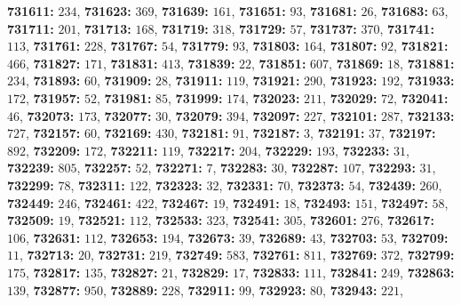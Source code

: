 \textsf{\bfseries 731611:} $234$, \textsf{\bfseries 731623:} $369$, \textsf{\bfseries 731639:} $161$, \textsf{\bfseries 731651:} $93$, \textsf{\bfseries 731681:} $26$, \textsf{\bfseries 731683:} $63$, \textsf{\bfseries 731711:} $201$, \textsf{\bfseries 731713:} $168$, \textsf{\bfseries 731719:} $318$, \textsf{\bfseries 731729:} $57$, \textsf{\bfseries 731737:} $370$, \textsf{\bfseries 731741:} $113$, \textsf{\bfseries 731761:} $228$, \textsf{\bfseries 731767:} $54$, \textsf{\bfseries 731779:} $93$, \textsf{\bfseries 731803:} $164$, \textsf{\bfseries 731807:} $92$, \textsf{\bfseries 731821:} $466$, \textsf{\bfseries 731827:} $171$, \textsf{\bfseries 731831:} $413$, \textsf{\bfseries 731839:} $22$, \textsf{\bfseries 731851:} $607$, \textsf{\bfseries 731869:} $18$, \textsf{\bfseries 731881:} $234$, \textsf{\bfseries 731893:} $60$, \textsf{\bfseries 731909:} $28$, \textsf{\bfseries 731911:} $119$, \textsf{\bfseries 731921:} $290$, \textsf{\bfseries 731923:} $192$, \textsf{\bfseries 731933:} $172$, \textsf{\bfseries 731957:} $52$, \textsf{\bfseries 731981:} $85$, \textsf{\bfseries 731999:} $174$, \textsf{\bfseries 732023:} $211$, \textsf{\bfseries 732029:} $72$, \textsf{\bfseries 732041:} $46$, \textsf{\bfseries 732073:} $173$, \textsf{\bfseries 732077:} $30$, \textsf{\bfseries 732079:} $394$, \textsf{\bfseries 732097:} $227$, \textsf{\bfseries 732101:} $287$, \textsf{\bfseries 732133:} $727$, \textsf{\bfseries 732157:} $60$, \textsf{\bfseries 732169:} $430$, \textsf{\bfseries 732181:} $91$, \textsf{\bfseries 732187:} $3$, \textsf{\bfseries 732191:} $37$, \textsf{\bfseries 732197:} $892$, \textsf{\bfseries 732209:} $172$, \textsf{\bfseries 732211:} $119$, \textsf{\bfseries 732217:} $204$, \textsf{\bfseries 732229:} $193$, \textsf{\bfseries 732233:} $31$, \textsf{\bfseries 732239:} $805$, \textsf{\bfseries 732257:} $52$, \textsf{\bfseries 732271:} $7$, \textsf{\bfseries 732283:} $30$, \textsf{\bfseries 732287:} $107$, \textsf{\bfseries 732293:} $31$, \textsf{\bfseries 732299:} $78$, \textsf{\bfseries 732311:} $122$, \textsf{\bfseries 732323:} $32$, \textsf{\bfseries 732331:} $70$, \textsf{\bfseries 732373:} $54$, \textsf{\bfseries 732439:} $260$, \textsf{\bfseries 732449:} $246$, \textsf{\bfseries 732461:} $422$, \textsf{\bfseries 732467:} $19$, \textsf{\bfseries 732491:} $18$, \textsf{\bfseries 732493:} $151$, \textsf{\bfseries 732497:} $58$, \textsf{\bfseries 732509:} $19$, \textsf{\bfseries 732521:} $112$, \textsf{\bfseries 732533:} $323$, \textsf{\bfseries 732541:} $305$, \textsf{\bfseries 732601:} $276$, \textsf{\bfseries 732617:} $106$, \textsf{\bfseries 732631:} $112$, \textsf{\bfseries 732653:} $194$, \textsf{\bfseries 732673:} $39$, \textsf{\bfseries 732689:} $43$, \textsf{\bfseries 732703:} $53$, \textsf{\bfseries 732709:} $11$, \textsf{\bfseries 732713:} $20$, \textsf{\bfseries 732731:} $219$, \textsf{\bfseries 732749:} $583$, \textsf{\bfseries 732761:} $811$, \textsf{\bfseries 732769:} $372$, \textsf{\bfseries 732799:} $175$, \textsf{\bfseries 732817:} $135$, \textsf{\bfseries 732827:} $21$, \textsf{\bfseries 732829:} $17$, \textsf{\bfseries 732833:} $111$, \textsf{\bfseries 732841:} $249$, \textsf{\bfseries 732863:} $139$, \textsf{\bfseries 732877:} $950$, \textsf{\bfseries 732889:} $228$, \textsf{\bfseries 732911:} $99$, \textsf{\bfseries 732923:} $80$, \textsf{\bfseries 732943:} $221$, 
